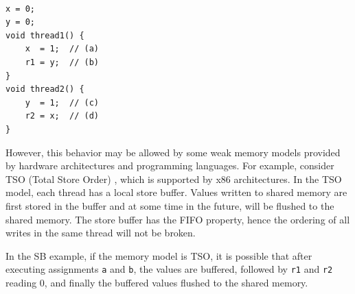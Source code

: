 
\begin{lstlisting}[caption={Store Buffer (SB) program}, label={SB}]

x = 0;
y = 0;
void thread1() {
    x  = 1;  // (a) 
    r1 = y;  // (b)
}
void thread2() {
    y  = 1;  // (c)
    r2 = x;  // (d)
}

\end{lstlisting}



However, this behavior may be allowed by some weak memory models provided by hardware architectures and programming languages. For example, consider TSO (Total Store Order) \cite{TSO}, which is supported by x86 architectures. In the TSO model, each thread has a local store buffer. Values written to shared memory are first stored in the buffer and at some time in the future, will be flushed to the shared memory. The store buffer has the FIFO property, hence the ordering of all writes in the same thread will not be broken.

In the SB example, if the memory model is TSO, it is possible that after executing assignments \texttt{a} and \texttt{b}, the values are buffered, followed by \texttt{r1} and \texttt{r2} reading 0, and finally the buffered values flushed to the shared memory.

